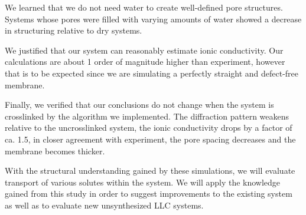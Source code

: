 \documentclass{article}
\begin{document}
  We learned that we do not need water to create well-defined pore structures.
  Systems whose pores were filled with varying amounts of water showed a decrease
  in structuring relative to dry systems. 

  We justified that our system can reasonably estimate ionic conductivity.  Our
  calculations are about 1 order of magnitude higher than experiment, however
  that is to be expected since we are simulating a perfectly straight and
  defect-free membrane. 

  Finally, we verified that our conclusions do not change when the system is
  crosslinked by the algorithm we implemented. The diffraction pattern weakens
  relative to the uncrosslinked system, the ionic conductivity drops by a factor
  of ca. 1.5, in closer agreement with experiment, the pore spacing decreases and
  the membrane becomes thicker. 

  With the structural understanding gained by these simulations, we will
  evaluate transport of various solutes within the system. We will apply the
  knowledge gained from this study in order to suggest improvements to the
  existing system as well as to evaluate new unsynthesized LLC systems.

  \clearpage
  
\end{document}
